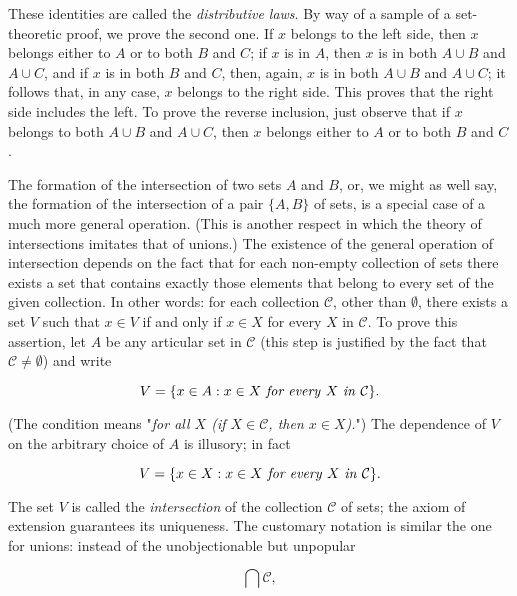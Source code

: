 These identities are called the \textit{distributive laws}. By way of a sample of a set-theoretic proof, we prove the second one. If $x$ belongs to the left side, then $x$ belongs either to $A$ or to both $B$ and $C$; if $x$ is in $A$, then $x$ is in both $A \cup B$ and $A \cup C$, and if $x$ is in both $B$ and $C$, then, again, $x$ is in both $A \cup B$ and $A \cup C$; it follows that, in any case, $x$ belongs to the right side. This proves that the right side includes the left. To prove the reverse inclusion, just observe that if $x$ belongs to both $A \cup B$ and $A \cup C$, then $x$ belongs either to $A$ or to both $B$ and $C$. 

The formation of the intersection of two sets $A$ and $B$, or, we might as well say, the formation of the intersection of a pair $ \{ A, B \} $ of sets, is a special case of a much more general operation. (This is another respect in which the theory of intersections imitates that of unions.) The existence of the general operation of intersection depends on the fact that for each non-empty collection of sets there exists a set that contains exactly those elements that belong to every set of the given collection. In other words: for each collection $\mathcal{C}$, other than $ \emptyset $, there exists a set $V$ such that $x \in V$ if and only if $x \in X$ for every $X$ in $\mathcal{C}$. To prove this assertion, let $A$ be any articular set in $\mathcal{C}$ (this step is justified by the fact that $\mathcal{C} \neq \emptyset$) and write

\begin{equation*}
V = \{ x \in A: x \in X \text{ \textit{for every} } X \text{ \textit{in} } \mathcal{C} \}.
\end{equation*}

(The condition means "\textit{for all $X$ (if $X \in \mathcal{C}$, then $x \in X$).}") The dependence of $V$ on the arbitrary choice of $A$ is illusory; in fact

\begin{equation*}
V = \{ x \in X: x \in X \text{ \textit{for every} } X \text{ \textit{in} } \mathcal{C} \}.
\end{equation*}

The set $V$ is called the \textit{intersection} of the collection $ \mathcal{C} $ of sets; the axiom of extension guarantees its uniqueness. The customary notation is similar the one for unions: instead of the unobjectionable but unpopular

\begin{equation*}
\bigcap \mathcal{C} ,
\end{equation*}

